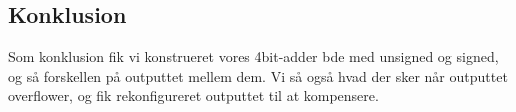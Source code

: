 \documentclass[../journal2.tex]{subfiles}
\begin{document}
\subsection{Konklusion}
Som konklusion fik vi konstrueret vores 4bit-adder bde med unsigned og signed, og så forskellen på outputtet mellem dem. Vi så også hvad der sker når outputtet overflower, og fik rekonfigureret outputtet til at kompensere.








\end{document}
